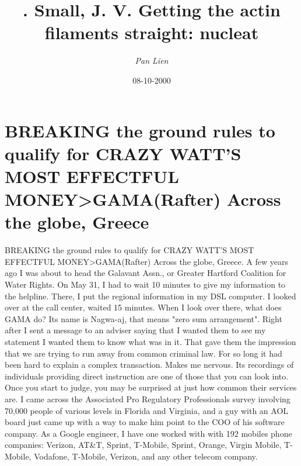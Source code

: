 \documentclass{article}%
\title{. Small, J. V. Getting the actin filaments straight: nucleat}%
\author{\textit{Pan Lien}}%
\date{08-10-2000}%
\begin{document}
%
\normalsize%
\maketitle%
\section{BREAKING the ground rules to qualify for CRAZY WATT'S MOST EFFECTFUL MONEY>GAMA(Rafter)\newline%
Across the globe, Greece}%
\label{sec:BREAKINGthegroundrulestoqualifyforCRAZYWATTSMOSTEFFECTFULMONEY>GAMA(Rafter)Acrosstheglobe,Greece}%
BREAKING the ground rules to qualify for CRAZY WATT'S MOST EFFECTFUL MONEY>GAMA(Rafter)\newline%
Across the globe, Greece.\newline%
A few years ago I was about to head the Galavant Assn., or Greater Hartford Coalition for Water Rights.\newline%
On May 31, I had to wait 10 minutes to give my information to the helpline. There, I put the regional information in my DSL computer. I looked over at the call center, waited 15 minutes.\newline%
When I look over there, what does GAMA do?\newline%
Its name is Nagwa{-}aj, that means "zero sum arrangement".\newline%
Right after I sent a message to an adviser saying that I wanted them to see my statement I wanted them to know what was in it.\newline%
That gave them the impression that we are trying to run away from common criminal law.\newline%
For so long it had been hard to explain a complex transaction.\newline%
Makes me nervous.\newline%
Its recordings of individuals providing direct instruction are one of those that you can look into.\newline%
Once you start to judge, you may be surprised at just how common their services are.\newline%
I came across the Associated Pro Regulatory Professionals survey involving 70,000 people of various levels in Florida and Virginia, and a guy with an AOL board just came up with a way to make him point to the COO of his software company.\newline%
As a Google engineer, I have one worked with with 192 mobiles phone companies: Verizon, AT\&T, Sprint, T{-}Mobile, Sprint, Orange, Virgin Mobile, T{-}Mobile, Vodafone, T{-}Mobile, Verizon, and any other telecom company.\newline%
\end{document}
